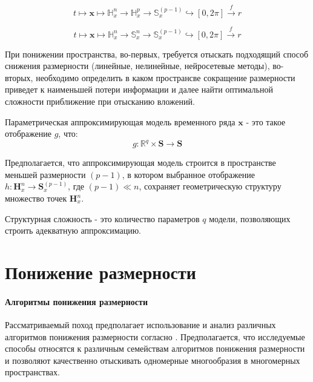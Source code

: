 \documentclass[12pt,twoside]{article}
\begin{document}
\begin{equation}
	t \mapsto \mathbf{x} \mapsto \mathbb{H}_{x}^{n} \xrightarrow{} \mathbb{H}_{x}^{p} \xrightarrow{} \mathbb{S}_x^{(p-1)} \hookrightarrow [0,2\pi] \xrightarrow{f} r
\label{eq:goal}
\end{equation}

\begin{equation}
	t \mapsto \mathbf{x} \mapsto \mathbb{H}_{x}^{n} \xrightarrow{} \mathbb{S}_{x}^{n} \xrightarrow{} \mathbb{S}_x^{(p-1)} \hookrightarrow [0,2\pi] \xrightarrow{f} r
\label{eq:goal_2}
\end{equation}

При понижении пространства, во-первых, требуется отыскать подходящий способ снижения размерности (линейные, нелинейные, нейросетевые методы), во-вторых, необходимо определить в каком пространсве сокращение размерности приведет к наименьшей потери информации и далее найти оптимальной сложности приближение при отысканию вложений. 
\vspace{\baselineskip}

\begin{Def}
Параметрическая аппроксимирующая модель временного ряда  $\mathbf{x}$  - это такое отображение $g$, что:
\begin{equation}
	g: \mathbb{R}^{q} \times \mathbf{S} \xrightarrow{} \mathbf{S}
\label{eq:param_model}
\end{equation}
\end{Def}

Предполагается, что аппроксимирующая модель строится в пространстве меньшей размерности $(p-1)$, в котором выбранное отображение $h: \mathbf{H}_{x}^{n} \xrightarrow{} \mathbf{S}_x^{(p-1)} $, где $(p-1)\ll n$, сохраняет геометрическую структуру множество точек $\mathbf{H}_{x}^{n}$. 

\begin{Def}
Структурная сложность - это количество параметров $q$ модели, позволяющих строить адекватную аппроксимацию.
\end{Def}



\section{Понижение размерности}
\paragraph{Алгоритмы понижения размерности}
Рассматриваемый поход предполагает использование и анализ различных алгоритмов понижения размерности согласно \cite{Maaten2007}.
Предполагается, что исследуемые способы относятся к различным семействам алгоритмов понижения размерности и позволяют качественно отыскивать одномерные многообразия в многомерных пространствах.
\end{document}
